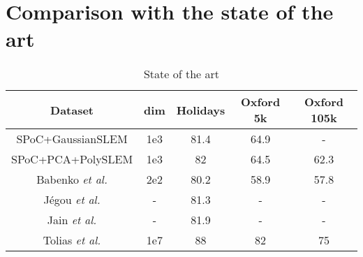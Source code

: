 \section{Comparison with the state of the art}

\begin{table}[!h]
    \centering
    \caption{State of the art}
    \begin{tabular}{|c|c|c|c|c|}
    \hline
    Dataset & dim &\textbf{Holidays} & \textbf{Oxford 5k} & \textbf{Oxford 105k}\\
    \hline
    \hline
    SPoC+GaussianSLEM                           & 1e3  &  81.4   &  64.9  &   -  \\
    SPoC+PCA+PolySLEM                           & 1e3  &  82    &   64.5  &  62.3 \\
    Babenko \textit{et al.} \cite{babenko15}    & 2e2  &  80.2  &   58.9  &  57.8 \\
    J\'egou \textit{et al.} \cite{sota1}        & -    &  81.3  &    -    &   -   \\
    Jain \textit{et al. } \cite{JaJeGro11}      &   -  &  81.9  &    -    &   -   \\
    Tolias \textit{et al.} \cite{Tolias13}      & 1e7  &  88    &   82    &  75   \\
    \hline
    \end{tabular}
    \label{tab:sota}
\end{table}


